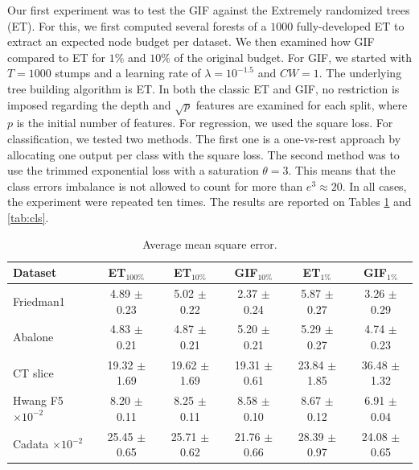 \documentclass{article}
\newcommand{\bestA}{\cellcolor{orange}}
\newcommand{\bestB}{\cellcolor{dodgerblue}}
\begin{document}
Our first experiment was to test the GIF against the Extremely randomized trees 
(ET).
For this, we first computed several forests of a $1000$ fully-developed ET to 
extract an expected node budget per dataset. We then examined how GIF compared 
to ET for $1\%$ and $10\%$ of the original budget.
For GIF, we started with $T=1000$ stumps and a learning rate of $\lambda = 
10^{-1.5}$ and $CW=1$. The underlying tree building algorithm is ET. In both 
the classic ET and GIF, no restriction is imposed regarding the depth and 
$\sqrt{p}$ features are examined for each split, where $p$ is the initial 
number of features.
For regression, we used the square loss.
For classification, we tested two methods. The first one is a one-vs-rest 
approach by allocating one output per class with the square loss. The second 
method was to use the trimmed exponential loss with a saturation $\theta = 3$. 
This means that the class errors imbalance is not allowed to count for more 
than $e^3 \approx 20$. In all cases, the experiment were repeated ten times. 
The results are reported on Tables \ref{tab:reg} and \ref{tab:cls}.
  
\begin{table}[t]
\caption{Average mean square error.}
\label{tab:reg}
\vskip 0.15in
\begin{center}
\begin{small}
\begin{sc}
\begin{tabular}{l|c|cc|cc}
\hline
Dataset & ET$_{100\%}$ & ET$_{10\%}$ & GIF$_{10\%}$ & ET$_{1\%}$ & GIF$_{1\%}$\\
\hline
Friedman1 & 4.89 $\pm$ 0.23 & 5.02 $\pm$ 0.22 & \bestA 2.37 $\pm$ 0.24 & 5.87 
$\pm$ 0.27 & \bestB 3.26 $\pm$ 0.29 \\
Abalone & 4.83 $\pm$ 0.21 & \bestA 4.87 $\pm$ 0.21 & 5.20 $\pm$ 0.21 & 5.29 
$\pm$ 0.27 & \bestB 4.74 $\pm$ 0.23 \\
CT slice & 19.32 $\pm$ 1.69 & 19.62 $\pm$ 1.69 & \bestA 19.31 $\pm$ 0.61 & 
\bestB 23.84 $\pm$ 1.85 & 36.48 $\pm$ 1.32 \\
Hwang F5 \hfill {\tiny $\times 10^{-2}$} & 8.20 $\pm$ 0.11 & \bestA 8.25 $\pm$ 
0.11 & 8.58 $\pm$ 0.10 & 8.67 $\pm$ 0.12 & \bestB 6.91 $\pm$ 0.04 \\
Cadata \hfill {\tiny $\times 10^{-2}$} & 25.45 $\pm$ 0.65 & 25.71 $\pm$ 0.62 & 
\bestA 21.76 $\pm$ 0.66 & 28.39 $\pm$ 0.97 & \bestB 24.08 $\pm$ 0.65 \\
\hline
\end{tabular}
\end{sc}
\end{small}
\end{center}
\vskip -0.1in
\end{table}
\end{document}

